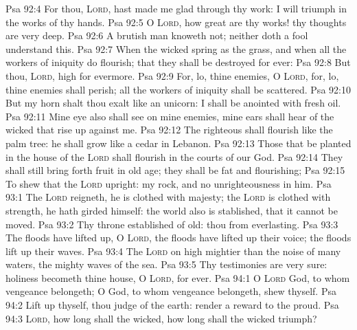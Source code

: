 \vs Psa 92:4 For thou, \textsc{Lord}, hast made me glad through thy work: I will triumph in the works of thy hands.
\vs Psa 92:5 O \textsc{Lord}, how great are thy works!  thy thoughts are very deep.
\vs Psa 92:6 A brutish man knoweth not; neither doth a fool understand this.
\vs Psa 92:7 When the wicked spring as the grass, and when all the workers of iniquity do flourish;  that they shall be destroyed for ever:
\vs Psa 92:8 But thou, \textsc{Lord},  high for evermore.
\vs Psa 92:9 For, lo, thine enemies, O \textsc{Lord}, for, lo, thine enemies shall perish; all the workers of iniquity shall be scattered.
\vs Psa 92:10 But my horn shalt thou exalt like  an unicorn: I shall be anointed with fresh oil.
\vs Psa 92:11 Mine eye also shall see  on mine enemies,  mine ears shall hear  of the wicked that rise up against me.
\vs Psa 92:12 The righteous shall flourish like the palm tree: he shall grow like a cedar in Lebanon.
\vs Psa 92:13 Those that be planted in the house of the \textsc{Lord} shall flourish in the courts of our God.
\vs Psa 92:14 They shall still bring forth fruit in old age; they shall be fat and flourishing;
\vs Psa 92:15 To shew that the \textsc{Lord}  upright:  my rock, and  no unrighteousness in him.
\vs Psa 93:1 The \textsc{Lord} reigneth, he is clothed with majesty; the \textsc{Lord} is clothed with strength,  he hath girded himself: the world also is stablished, that it cannot be moved.
\vs Psa 93:2 Thy throne  established of old: thou  from everlasting.
\vs Psa 93:3 The floods have lifted up, O \textsc{Lord}, the floods have lifted up their voice; the floods lift up their waves.
\vs Psa 93:4 The \textsc{Lord} on high  mightier than the noise of many waters,  the mighty waves of the sea.
\vs Psa 93:5 Thy testimonies are very sure: holiness becometh thine house, O \textsc{Lord}, for ever.
\vs Psa 94:1 O \textsc{Lord} God, to whom vengeance belongeth; O God, to whom vengeance belongeth, shew thyself.
\vs Psa 94:2 Lift up thyself, thou judge of the earth: render a reward to the proud.
\vs Psa 94:3 \textsc{Lord}, how long shall the wicked, how long shall the wicked triumph?
